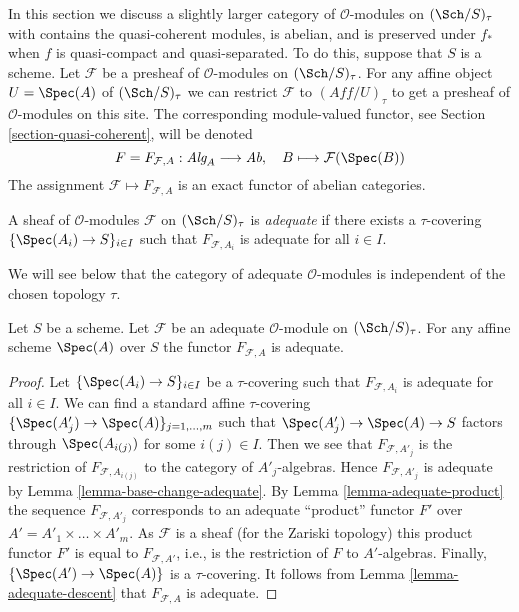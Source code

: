 \medskip\noindent
In this section we discuss a slightly larger category
of $\mathcal{O}$-modules on $(\Sch/S)_\tau$ with contains the
quasi-coherent modules, is abelian, and is preserved under $f_*$ when
$f$ is quasi-compact and quasi-separated.
To do this, suppose that $S$ is a scheme. Let $\mathcal{F}$ be a presheaf
of $\mathcal{O}$-modules on $(\Sch/S)_\tau$.
For any affine object $U = \Spec(A)$ of $(\Sch/S)_\tau$
we can restrict $\mathcal{F}$ to $(\textit{Aff}/U)_\tau$ to get
a presheaf of $\mathcal{O}$-modules on this site. The corresponding
module-valued functor, see
Section \ref{section-quasi-coherent},
will be denoted
$$
F = F_{\mathcal{F}, A} :
\textit{Alg}_A \longrightarrow \textit{Ab},
\quad
B \longmapsto \mathcal{F}(\Spec(B))
$$
The assignment $\mathcal{F} \mapsto F_{\mathcal{F}, A}$ is an exact
functor of abelian categories.

\begin{definition}
\label{definition-adequate}
A sheaf of $\mathcal{O}$-modules $\mathcal{F}$ on $(\Sch/S)_\tau$ is
{\it adequate} if there exists a $\tau$-covering
$\{\Spec(A_i) \to S\}_{i \in I}$ such that $F_{\mathcal{F}, A_i}$ is
adequate for all $i \in I$.
\end{definition}

\noindent
We will see below that the category of adequate $\mathcal{O}$-modules
is independent of the chosen topology $\tau$.

\begin{lemma}
\label{lemma-adequate-local}
Let $S$ be a scheme. Let $\mathcal{F}$ be an adequate $\mathcal{O}$-module on
$(\Sch/S)_\tau$. For any affine scheme $\Spec(A)$ over $S$
the functor $F_{\mathcal{F}, A}$ is adequate.
\end{lemma}

\begin{proof}
Let $\{\Spec(A_i) \to S\}_{i \in I}$ be a $\tau$-covering
such that $F_{\mathcal{F}, A_i}$ is adequate for all $i \in I$.
We can find a standard affine $\tau$-covering
$\{\Spec(A'_j) \to \Spec(A)\}_{j = 1, \ldots, m}$
such that $\Spec(A'_j) \to \Spec(A) \to S$ factors
through $\Spec(A_{i(j)})$ for some $i(j) \in I$. Then we see that
$F_{\mathcal{F}, A'_j}$ is the restriction of
$F_{\mathcal{F}, A_{i(j)}}$ to the category of $A'_j$-algebras.
Hence $F_{\mathcal{F}, A'_j}$ is adequate by
Lemma \ref{lemma-base-change-adequate}.
By
Lemma \ref{lemma-adequate-product}
the sequence
$F_{\mathcal{F}, A'_j}$ corresponds to an adequate ``product'' functor
$F'$ over $A' = A'_1 \times \ldots \times A'_m$. As $\mathcal{F}$ is a
sheaf (for the Zariski topology) this product functor $F'$ is equal
to $F_{\mathcal{F}, A'}$, i.e., is the restriction of $F$ to $A'$-algebras.
Finally,  $\{\Spec(A') \to \Spec(A)\}$ is a $\tau$-covering.
It follows from
Lemma \ref{lemma-adequate-descent}
that $F_{\mathcal{F}, A}$ is adequate.
\end{proof}

